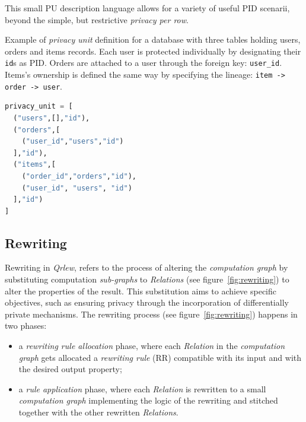 \documentclass[letterpaper]{article} %
\newcommand{\qrlew}{\emph{Qrlew}}
\begin{document}
This small PU description language allows for a variety of useful PID scenarii, beyond the simple, but restrictive \emph{privacy per row}.

\begin{listing}[tb]
\caption{Example of \emph{privacy unit} definition for a database with three tables holding users, orders and items records. Each user is protected individually by designating their \texttt{id}s as PID. Orders are attached to a user through the foreign key: \texttt{user\_id}. Items's ownership is defined the same way by specifying the lineage: \texttt{item -> order -> user}.}%
\label{lst:pe}
\begin{lstlisting}[language=Python]
privacy_unit = [
  ("users",[],"id"),
  ("orders",[
    ("user_id","users","id")
  ],"id"),
  ("items",[
    ("order_id","orders","id"),
    ("user_id", "users", "id")
  ],"id")
]
\end{lstlisting}
\end{listing}

\subsection{Rewriting}
\label{sec:rewritting}

Rewriting in \qrlew{}, refers to the process of altering the \emph{computation graph} by substituting computation \emph{sub-graphs} to \emph{Relations} (see figure~\ref{fig:rewriting}) to alter the properties of the result. This substitution aims to achieve specific objectives, such as ensuring privacy through the incorporation of differentially private mechanisms. The rewriting process (see figure~\ref{fig:rewriting}) happens in two phases:
\begin{itemize}
    \item a \emph{rewriting rule allocation} phase, where each \emph{Relation} in the \emph{computation graph} gets allocated a \emph{rewriting rule} (RR) compatible with its input and with the desired output property;
    \item a \emph{rule application} phase, where each \emph{Relation} is rewritten to a small \emph{computation graph} implementing the logic of the rewriting and stitched together with the other rewritten \emph{Relations}.
\end{itemize}
\end{document}
